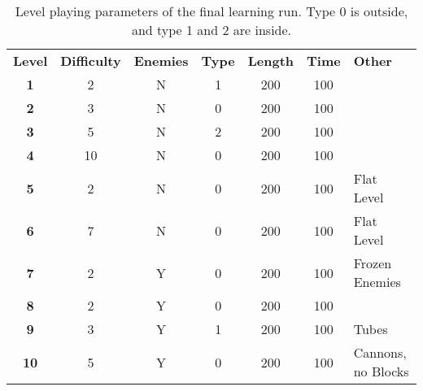 \begin{table}
  \begin{adjustwidth}{-0cm}{-0cm}
  \begin{center} \footnotesize
    \begin{tabular}{ | c | c | c | c | c | c | l |}
    \hline
    \textbf{Level} & \textbf{Difficulty} & \textbf{Enemies} & \textbf{Type} & \textbf{Length} & \textbf{Time} & \textbf{Other} \TBstrut \\ \thickhline
    \textbf{1} & 2 & N & 1 & 200 & 100 &  \\ \hline
    \textbf{2} & 3 & N & 0 & 200 & 100 & \\ \hline
    \textbf{3} & 5 & N & 2 & 200 & 100 & \\ \hline
    \textbf{4} & 10 & N & 0 & 200 & 100 & \\ \hline
    \textbf{5} & 2 & N & 0 & 200 & 100 & Flat Level \\ \hline
    \textbf{6} & 7 & N & 0 & 200 & 100 & Flat Level \\ \hline
    \textbf{7} & 2 & Y & 0 & 200 & 100 & Frozen Enemies \\ \hline
    \textbf{8} & 2 & Y & 0 & 200 & 100 &  \\ \hline
    \textbf{9} & 3 & Y & 1 & 200 & 100 & Tubes \\ \hline
    \textbf{10} & 5 & Y & 0 & 200 & 100 & Cannons, no Blocks \\ \hline
    \end{tabular}
  \end{center}
  \end{adjustwidth}
  \caption{Level playing parameters of the final learning run. Type 0 is outside, and type 1 and 2 are inside. }
  \label{tab:evalparams}
\end{table}

